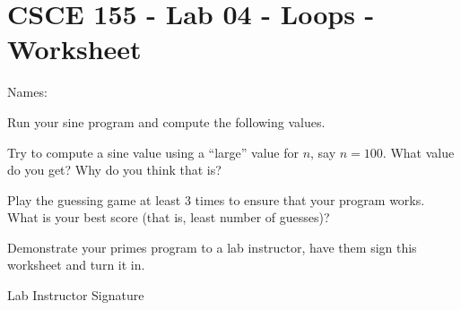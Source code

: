 \documentclass[12pt]{exam}
\begin{document}
\section*{CSCE 155 - Lab 04 - Loops - Worksheet}

Names: \underline{\hspace{10cm}}

\begin{questions}

\question Run your sine program and compute the following values.

\question Try to compute a sine value using a ``large'' value for $n$, say $n = 100$.
What value do you get?  Why do you think that is?
    \begin{solution}[3cm]
    \end{solution}

\question Play the guessing game at least 3 times to ensure that your program works.  What is your best score (that is, least number of guesses)?
    \begin{solution}[3cm]
    \end{solution}

\question Demonstrate your primes program to a lab instructor, have them sign this worksheet and turn it in.
\end{questions}
  
Lab Instructor Signature\underline{\hspace{7.5cm}}
\end{document}
